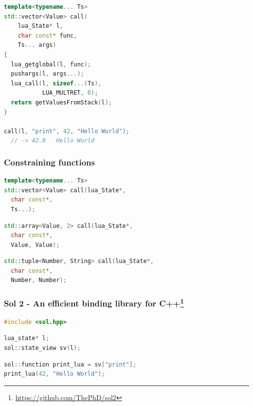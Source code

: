 \documentclass{beamer}
\newif\iftransitions
\begin{document}
\begin{frame}[fragile]
\begin{semiverbatim}
getValuesFromStack(l);  }}
\uncover<1->{\alert<0>{\}}}

\uncover<6->{\alert<6>{call(l, "print", 42, "Hello World");}}
\uncover<6->{\alert<6>{  // -> 42.0   Hello World}}
  \end{semiverbatim}
  \else
  \begin{lstlisting}[language={C++}]
template<typename... Ts>
std::vector<Value> call(
    lua_State* l,
    char const* func,
    Ts... args)
{
  lua_getglobal(l, func);
  pushargs(l, args...);
  lua_call(l, sizeof...(Ts),
           LUA_MULTRET, 0);
  return getValuesFromStack(l);  
}

call(l, "print", 42, "Hello World");
  // -> 42.0   Hello World
  \end{lstlisting}
  \fi
\end{frame}


\begin{frame}[fragile]
  \frametitle{Constraining functions}

  \begin{lstlisting}[language={C++}]
template<typename... Ts>
std::vector<Value> call(lua_State*,
  char const*,
  Ts...);
  \end{lstlisting}
  \iftransitions \pause \fi
  \begin{lstlisting}[language={C++}]
std::array<Value, 2> call(lua_State*,
  char const*,
  Value, Value);
  \end{lstlisting}
  \iftransitions \pause \fi
  \begin{lstlisting}[language={C++}]
std::tuple<Number, String> call(lua_State*,
  char const*,
  Number, Number);
  \end{lstlisting}

\end{frame}


\begin{frame}[fragile]
  \frametitle{Sol 2 - An efficient binding library for C++\footnote{\href{https://github.com/ThePhD/sol2}{https://github.com/ThePhD/sol2}}}
  
  
  \begin{lstlisting}[language={C++}]
#include <sol.hpp>
  \end{lstlisting}
  \iftransitions \pause \fi
  \begin{lstlisting}[language={C++}]
lua_state* l;
sol::state_view sv(l);
  \end{lstlisting}
  \iftransitions \pause \fi
  \begin{lstlisting}[language={C++}]
sol::function print_lua = sv["print"];
print_lua(42, "Hello World");
  \end{lstlisting}
\end{frame}
\end{document}
